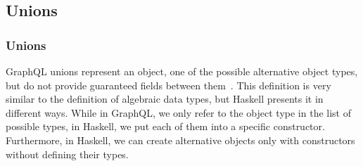 \subsection{Unions}
\begin{frame}\frametitle{Unions}

GraphQL unions represent an object, one of the possible alternative object types, but do not provide guaranteed fields between them~\cite{gql-spec}. This definition is very similar to the definition of algebraic data types, but Haskell presents it in different ways. While in GraphQL, we only refer to the object type in the list of possible types, in Haskell, we put each of them into a specific constructor. Furthermore, in Haskell, we can create alternative objects only with constructors without defining their types.








\end{frame}
